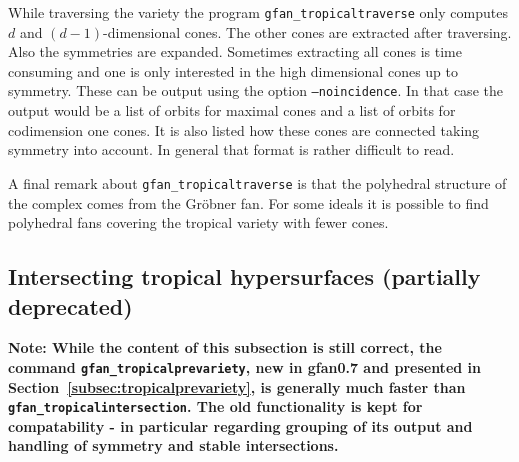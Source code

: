 
While traversing the variety the program
\texttt{gfan\_tropicaltraverse} only computes $d$ and
$(d-1)$-dimensional cones. The other cones are extracted after
traversing. Also the symmetries are expanded. Sometimes extracting all
cones is time consuming and one is only interested in the high
dimensional cones up to symmetry. These can be output using the option
\texttt{--noincidence}. In that case the output would be a list of
orbits for maximal cones and a list of orbits for codimension one
cones. It is also listed how these cones are connected taking symmetry
into account. In general that format is rather difficult to read.


A final remark about \texttt{gfan\_tropicaltraverse} is that the
polyhedral structure of the complex comes from the Gr\"obner fan. For
some ideals it is possible to find polyhedral fans covering the
tropical variety with fewer cones.


\subsection{Intersecting tropical hypersurfaces (partially deprecated)}
{\bf Note: While the content of this subsection is still correct, the command \texttt{gfan\_tropicalprevariety}, new in gfan0.7 and presented in Section~\ref{subsec:tropicalprevariety}, is generally much faster than \texttt{gfan\_tropicalintersection}. The old functionality is kept for compatability - in particular regarding grouping of its output and handling of symmetry and stable intersections.}

